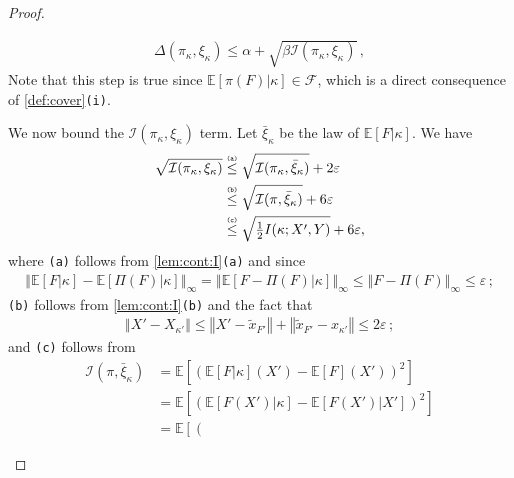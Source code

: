 \documentclass[letter, 12pt]{report}
\newcommand{\explan}[1]{\stackrel{\text{\tiny \texttt{#1}}}}
\newcommand{\norm}[1]{\left \Vert  #1 \right \Vert}
\newcommand{\E}{\mathbb E}
\newcommand{\sF}{\mathscr F}
\newcommand{\cI}{\mathcal I}
\newcommand{\1}{\mathbf{1}}
\renewcommand{\epsilon}{\varepsilon}
\theoremstyle{plain}
\theoremstyle{definition}
\theoremstyle{remark}
\begin{document}
\begin{proof}
\begin{enumsteps}
        \begin{align}
            \Delta(\pi_\kappa, \xi_\kappa) \leq \alpha + \sqrt{\beta \cI(\pi_\kappa, \xi_\kappa)}\,,
            \label{eq:tsmain-2}
        \end{align}
        Note that this step is true since $\E[\pi(F)|\kappa] \in \sF$, which is a direct consequence of \cref{def:cover}\texttt{(i)}.
        \item \label{step:tsmain-3} We now bound the $\cI(\pi_\kappa, \xi_\kappa)$ term.
        Let $\bar{\xi}_\kappa$ be the law of $\E[F|\kappa]$.
        We have
        \begin{align}
            \sqrt{\cI(\pi_\kappa, \xi_\kappa)}
             & \explan{(a)}
            \leq \sqrt{\cI(\pi_\kappa, \bar{\xi}_\kappa)} + 2\epsilon \nonumber \\
             & \explan{(b)}
            \leq \sqrt{\cI(\pi, \bar{\xi}_\kappa)} + 6\epsilon \nonumber        \\
             & \explan{(c)}
            \leq \sqrt{\tfrac12 I(\kappa; X', Y)} + 6\epsilon, \label{eq:tsmain-3}
        \end{align}
        where \texttt{(a)} follows from \cref{lem:cont:I}\texttt{(a)} and since
        \begin{align*}
            \norm{\E[F|\kappa] - \E[\Pi(F)|\kappa]}_\infty
            =
            \norm{\E[F - \Pi(F)|\kappa]}_\infty
            \leq \norm{F - \Pi(F)}_\infty
            \leq \epsilon \,;
        \end{align*}
        \texttt{(b)} follows from \cref{lem:cont:I}\texttt{(b)} and the fact that
        \begin{align*}
            \norm{X' - X_{\kappa'}}
            \leq \norm{X' - \tilde{x}_{F'}}
            +
            \norm{\tilde x_{F'} - x_{\kappa'}}
            \leq 2\epsilon\,;
        \end{align*}
        and \texttt{(c)} follows from
        \begin{align*}
            \cI(\pi, \bar{\xi}_\kappa)
             & =
            \E\left[
                \left(
                \E[F|\kappa](X')
                -
                \E[F](X')
                \right)^2
            \right] \\
             & =
            \E\left[
                \left(
                \E[F(X')|\kappa]
                -
                \E[F(X')|X']
                \right)^2
            \right] \\
             & =
            \E\left[
                \left(

\end{align*}
\end{enumsteps}
\end{proof}
\end{document}
